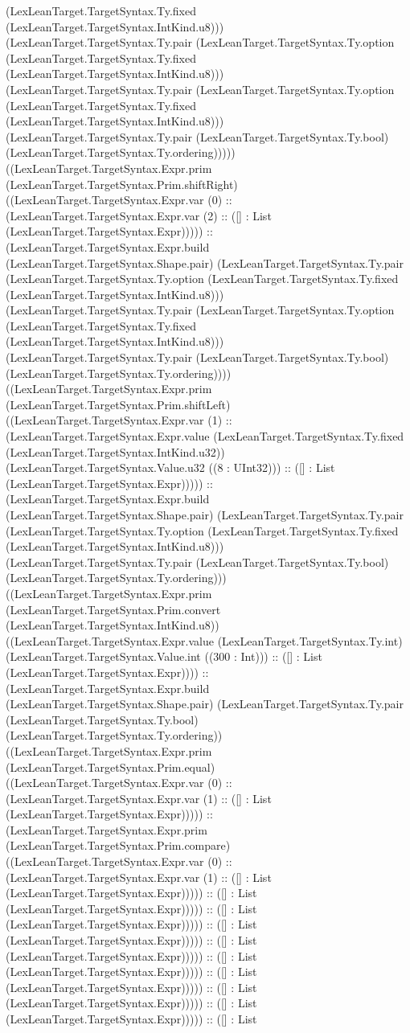 \documentclass[11pt]{article}
\begin{document}
(LexLeanTarget.TargetSyntax.Ty.fixed (LexLeanTarget.TargetSyntax.IntKind.u8))) (LexLeanTarget.TargetSyntax.Ty.pair (LexLeanTarget.TargetSyntax.Ty.option (LexLeanTarget.TargetSyntax.Ty.fixed (LexLeanTarget.TargetSyntax.IntKind.u8))) (LexLeanTarget.TargetSyntax.Ty.pair (LexLeanTarget.TargetSyntax.Ty.option (LexLeanTarget.TargetSyntax.Ty.fixed (LexLeanTarget.TargetSyntax.IntKind.u8))) (LexLeanTarget.TargetSyntax.Ty.pair (LexLeanTarget.TargetSyntax.Ty.bool) (LexLeanTarget.TargetSyntax.Ty.ordering))))) ((LexLeanTarget.TargetSyntax.Expr.prim (LexLeanTarget.TargetSyntax.Prim.shiftRight) ((LexLeanTarget.TargetSyntax.Expr.var (0) :: (LexLeanTarget.TargetSyntax.Expr.var (2) :: ([] : List (LexLeanTarget.TargetSyntax.Expr))))) :: (LexLeanTarget.TargetSyntax.Expr.build (LexLeanTarget.TargetSyntax.Shape.pair) (LexLeanTarget.TargetSyntax.Ty.pair (LexLeanTarget.TargetSyntax.Ty.option (LexLeanTarget.TargetSyntax.Ty.fixed (LexLeanTarget.TargetSyntax.IntKind.u8))) (LexLeanTarget.TargetSyntax.Ty.pair (LexLeanTarget.TargetSyntax.Ty.option (LexLeanTarget.TargetSyntax.Ty.fixed (LexLeanTarget.TargetSyntax.IntKind.u8))) (LexLeanTarget.TargetSyntax.Ty.pair (LexLeanTarget.TargetSyntax.Ty.bool) (LexLeanTarget.TargetSyntax.Ty.ordering)))) ((LexLeanTarget.TargetSyntax.Expr.prim (LexLeanTarget.TargetSyntax.Prim.shiftLeft) ((LexLeanTarget.TargetSyntax.Expr.var (1) :: (LexLeanTarget.TargetSyntax.Expr.value (LexLeanTarget.TargetSyntax.Ty.fixed (LexLeanTarget.TargetSyntax.IntKind.u32)) (LexLeanTarget.TargetSyntax.Value.u32 ((8 : UInt32))) :: ([] : List (LexLeanTarget.TargetSyntax.Expr))))) :: (LexLeanTarget.TargetSyntax.Expr.build (LexLeanTarget.TargetSyntax.Shape.pair) (LexLeanTarget.TargetSyntax.Ty.pair (LexLeanTarget.TargetSyntax.Ty.option (LexLeanTarget.TargetSyntax.Ty.fixed (LexLeanTarget.TargetSyntax.IntKind.u8))) (LexLeanTarget.TargetSyntax.Ty.pair (LexLeanTarget.TargetSyntax.Ty.bool) (LexLeanTarget.TargetSyntax.Ty.ordering))) ((LexLeanTarget.TargetSyntax.Expr.prim (LexLeanTarget.TargetSyntax.Prim.convert (LexLeanTarget.TargetSyntax.IntKind.u8)) ((LexLeanTarget.TargetSyntax.Expr.value (LexLeanTarget.TargetSyntax.Ty.int) (LexLeanTarget.TargetSyntax.Value.int ((300 : Int))) :: ([] : List (LexLeanTarget.TargetSyntax.Expr)))) :: (LexLeanTarget.TargetSyntax.Expr.build (LexLeanTarget.TargetSyntax.Shape.pair) (LexLeanTarget.TargetSyntax.Ty.pair (LexLeanTarget.TargetSyntax.Ty.bool) (LexLeanTarget.TargetSyntax.Ty.ordering)) ((LexLeanTarget.TargetSyntax.Expr.prim (LexLeanTarget.TargetSyntax.Prim.equal) ((LexLeanTarget.TargetSyntax.Expr.var (0) :: (LexLeanTarget.TargetSyntax.Expr.var (1) :: ([] : List (LexLeanTarget.TargetSyntax.Expr))))) :: (LexLeanTarget.TargetSyntax.Expr.prim (LexLeanTarget.TargetSyntax.Prim.compare) ((LexLeanTarget.TargetSyntax.Expr.var (0) :: (LexLeanTarget.TargetSyntax.Expr.var (1) :: ([] : List (LexLeanTarget.TargetSyntax.Expr))))) :: ([] : List (LexLeanTarget.TargetSyntax.Expr))))) :: ([] : List (LexLeanTarget.TargetSyntax.Expr))))) :: ([] : List (LexLeanTarget.TargetSyntax.Expr))))) :: ([] : List (LexLeanTarget.TargetSyntax.Expr))))) :: ([] : List (LexLeanTarget.TargetSyntax.Expr))))) :: ([] : List (LexLeanTarget.TargetSyntax.Expr))))) :: ([] : List (LexLeanTarget.TargetSyntax.Expr))))) :: ([] : List (LexLeanTarget.TargetSyntax.Expr))))) :: ([] : List 
\end{document}
